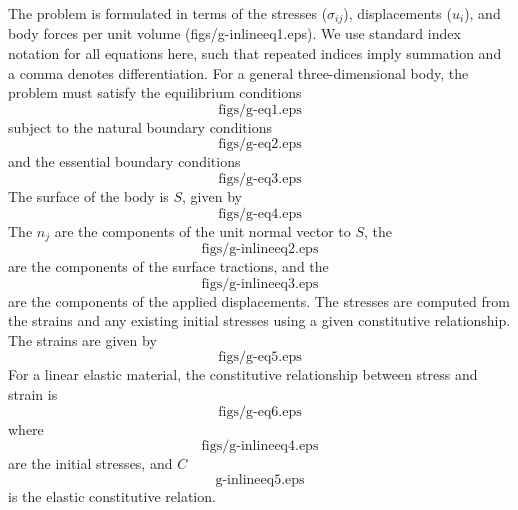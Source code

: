 The problem is formulated in terms of the stresses ($\sigma_{ij}$),
displacements ($u_i$), and body forces per unit volume
(figs/g-inlineeq1.eps). We use standard index notation for all
equations here, such that repeated indices imply summation and a comma
denotes differentiation. For a general three-dimensional body, the
problem must satisfy the equilibrium conditions
\begin{equation}
  \text{figs/g-eq1.eps}
\end{equation}
subject to the natural boundary conditions
\begin{equation}
  \text{figs/g-eq2.eps}
\end{equation}
and the essential boundary conditions
\begin{equation}
  \text{figs/g-eq3.eps}
\end{equation}
The surface of the body is $S$, given by
\begin{equation}
  \text{figs/g-eq4.eps}
\end{equation}
The $n_j$ are the components of the unit normal vector to $S$, the
\begin{equation}
  \text{figs/g-inlineeq2.eps}
\end{equation}
are the components of the surface tractions, and the 
\begin{equation}
  \text{figs/g-inlineeq3.eps}
\end{equation}
are the components of the applied displacements. The stresses are
computed from the strains and any existing initial stresses using a
given constitutive relationship. The strains are given by
\begin{equation}
\text{figs/g-eq5.eps}  
\end{equation}
For a linear elastic material, the constitutive relationship between
stress and strain is
\begin{equation}
  \text{figs/g-eq6.eps}
\end{equation}
where
\begin{equation}
  \text{figs/g-inlineeq4.eps}
\end{equation}
are the initial stresses, and $C$
\begin{equation}
  \text{g-inlineeq5.eps}
\end{equation}
is the elastic constitutive relation.

